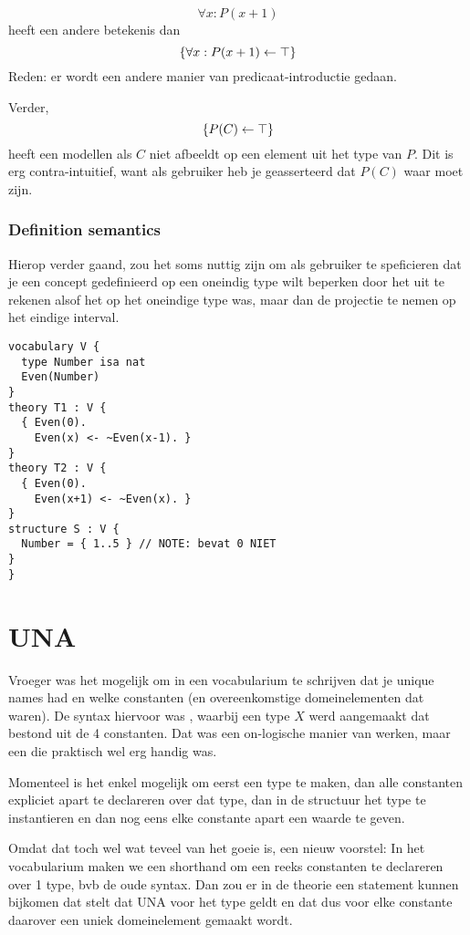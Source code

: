 \documentclass{article}
\begin{document}
\[\forall x: P(x+1)\]
heeft een andere betekenis dan
\[\{\forall x: P(x+1) \leftarrow \top \}\]
Reden: er wordt een andere manier van predicaat-introductie gedaan.

Verder, \[\{P(C) \leftarrow \top \}\] heeft een modellen als $C$ niet afbeeldt op een element uit het type van $P$. Dit is erg contra-intuitief, want als gebruiker heb je geasserteerd dat $P(C)$ waar moet zijn.

\subsubsection{Definition semantics}
Hierop verder gaand, zou het soms nuttig zijn om als gebruiker te speficieren dat je een concept gedefinieerd op een oneindig type wilt beperken door het uit te rekenen alsof het op het oneindige type was, maar dan de projectie te nemen op het eindige interval.

\begin{lstlisting}
vocabulary V {
  type Number isa nat
  Even(Number)
}
theory T1 : V {
  { Even(0).
    Even(x) <- ~Even(x-1). }
}
theory T2 : V {
  { Even(0).
    Even(x+1) <- ~Even(x). }
}
structure S : V {
  Number = { 1..5 } // NOTE: bevat 0 NIET
}
}
\end{lstlisting}


\section{UNA}
Vroeger was het mogelijk om in een vocabularium te schrijven dat je unique names had en welke constanten (en overeenkomstige domeinelementen dat waren).
De syntax hiervoor was , waarbij een type $X$ werd aangemaakt dat bestond uit de 4 constanten.
Dat was een on-logische manier van werken, maar een die praktisch wel erg handig was.

Momenteel is het enkel mogelijk om eerst een type te maken, dan alle constanten expliciet apart te declareren over dat type, dan in de structuur het type te instantieren en dan nog eens elke constante apart een waarde te geven.

Omdat dat toch wel wat teveel van het goeie is, een nieuw voorstel:
In het vocabularium maken we een shorthand om een reeks constanten te declareren over 1 type, bvb de oude syntax.
Dan zou er in de theorie een statement kunnen bijkomen dat stelt dat UNA voor het type geldt en dat dus voor elke constante daarover een uniek domeinelement gemaakt wordt.

\end{document}
